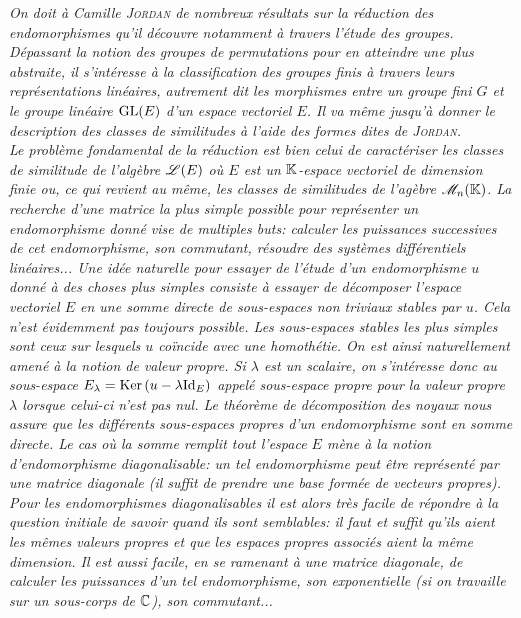 \textsl{On doit à Camille \textsc{Jordan} de nombreux résultats sur la réduction des endomorphismes qu'il découvre notamment à travers l'étude des groupes. Dépassant la notion des groupes de permutations pour en atteindre une plus abstraite, il s'intéresse à la classification des groupes finis à travers leurs représentations linéaires, autrement dit les morphismes entre un groupe fini $G$ et le groupe linéaire $\mathrm{GL} (E)$ d'un espace vectoriel $E$. Il va même jusqu'à donner le description des classes de similitudes à l'aide des formes dites de \textsc{Jordan}.}\\
\textsl{Le problème fondamental de la réduction est bien celui de caractériser les classes de similitude de l'algèbre $\mathscr{L}(E)$ où $E$ est un $\mathbb{K}$-espace vectoriel de dimension finie ou, ce qui revient au même, les classes de similitudes de l'agèbre $\mathscr{M}_n(\mathbb{K})$. La recherche d'une matrice la plus simple possible pour représenter un endomorphisme donné vise de multiples buts: calculer les puissances successives de cet endomorphisme, son commutant, résoudre des systèmes différentiels linéaires... Une idée naturelle pour essayer de  l'étude d'un endomorphisme $u$ donné à des choses plus simples consiste à essayer de décomposer l'espace vectoriel $E$ en une somme directe de sous-espaces non triviaux stables par $u$. Cela n'est évidemment pas toujours possible. Les sous-espaces stables les plus simples sont ceux sur lesquels $u$ coïncide avec une homothétie. On est ainsi naturellement amené à la notion de valeur propre. Si $\lambda$ est un scalaire, on s'intéresse donc au sous-espace $E_\lambda = \mathrm{Ker}\,(u - \lambda \mathrm{Id}_E)$ appelé sous-espace propre pour la valeur propre $\lambda$ lorsque celui-ci n'est pas nul. Le théorème de décomposition des noyaux nous assure que les différents sous-espaces propres d'un endomorphisme sont en somme directe. Le cas où la somme remplit tout l'espace $E$ mène à la notion d'endomorphisme diagonalisable: un tel endomorphisme peut être représenté par une matrice diagonale (il suffit de prendre une base formée de vecteurs propres). Pour les endomorphismes diagonalisables il est alors très facile de répondre à la question initiale de savoir quand ils sont semblables: il faut et suffit qu'ils aient les mêmes valeurs propres et que les espaces propres associés aient la même dimension. Il est aussi facile, en se ramenant à une matrice diagonale, de calculer les puissances d'un tel endomorphisme, son exponentielle (si on travaille sur un sous-corps de $\mathbb{C}$), son commutant...} \\

